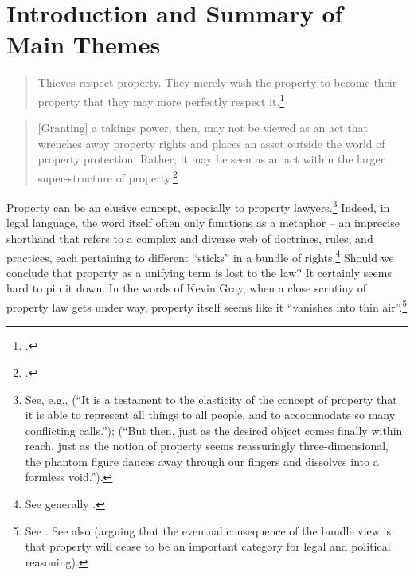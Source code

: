\chapter{Introduction and Summary of Main Themes}\label{chap:1}

\begin{quote} \small
Thieves respect property. They merely wish the property to become their property that they may more perfectly respect it.\footnote{\cite[58]{chesterton08}.}
\end{quote}
\begin{quote} \small
[Granting] a takings power, then, may not be viewed as an act that wrenches away property rights and places an asset outside the world of property protection. Rather, it may be seen as an act within the larger super-structure of property.\footnote{\cite[583]{bell09}.}
\end{quote}
%
%
%

Property can be an elusive concept, especially to property lawyers.\footnote{See, e.g., \cite[225-226]{waring09} (``It is a testament to the elasticity of the concept of 
property that it is able to represent all things to all people, and to accommodate so many conflicting calls.''); \cite[252]{gray91} (``But then, just as the desired object comes finally within reach, just as the notion of property seems reassuringly three-dimensional, the phantom figure dances away through our fingers and dissolves into a formless void.'').} Indeed, in legal language, the word itself often only functions as a metaphor -- an imprecise shorthand that refers to a complex and diverse web of doctrines, rules, and practices, each pertaining to different ``sticks'' in a bundle of rights.\footnote{See generally \cite{grey80,klein11}.} Should we conclude that property as a unifying term is lost to the law? It certainly seems hard to pin it down. In the words of Kevin Gray, when a close scrutiny of property law gets under way, property itself seems like it ``vanishes into thin air''.\footnote{See \cite[306-307]{gray91}. See also \cite[81]{grey80} (arguing that the eventual consequence of the bundle view is that property will cease to be an important category for legal and political reasoning).}

